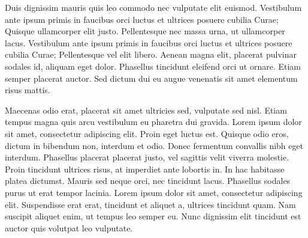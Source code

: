 \documentclass[twoside,emptyfirstpagenumber,swedish]{../thesis}
\begin{document}
Duis dignissim mauris quis leo commodo nec vulputate elit euismod. Vestibulum ante ipsum primis in faucibus orci luctus et ultrices posuere cubilia Curae; Quisque ullamcorper elit justo. Pellentesque nec massa urna, ut ullamcorper lacus. Vestibulum ante ipsum primis in faucibus orci luctus et ultrices posuere cubilia Curae; Pellentesque vel elit libero. Aenean magna elit, placerat pulvinar sodales id, aliquam eget dolor. Phasellus tincidunt eleifend orci ut ornare. Etiam semper placerat auctor. Sed dictum dui eu augue venenatis sit amet elementum risus mattis.

Maecenas odio erat, placerat sit amet ultricies sed, vulputate sed nisl. Etiam tempus magna quis arcu vestibulum eu pharetra dui gravida. Lorem ipsum dolor sit amet, consectetur adipiscing elit. Proin eget luctus est. Quisque odio eros, dictum in bibendum non, interdum et odio. Donec fermentum convallis nibh eget interdum. Phasellus placerat placerat justo, vel sagittis velit viverra molestie. Proin tincidunt ultrices risus, at imperdiet ante lobortis in. In hac habitasse platea dictumst. Mauris sed neque orci, nec tincidunt lacus. Phasellus sodales purus ut erat tempor lacinia. Lorem ipsum dolor sit amet, consectetur adipiscing elit. Suspendisse erat erat, tincidunt et aliquet a, ultrices tincidunt quam. Nam suscipit aliquet enim, ut tempus leo semper eu. Nunc dignissim elit tincidunt est auctor quis volutpat leo vulputate.
\end{document}
